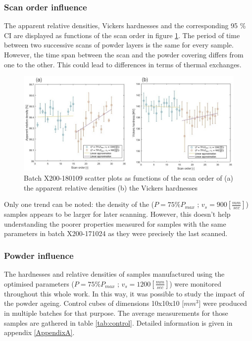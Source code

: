 \subsubsection{Scan order influence}
The apparent relative densities, Vickers hardnesses and the corresponding 95 \% CI are displayed as functions of the scan order in figure \ref{fig:180109-SO}. The period of time between two successive scans of powder layers is the same for every sample. However, the time span between the scan and the powder covering differs from one to the other. This could lead to differences in terms of thermal exchanges.\\

\begin{figure}[ht]
\centering
\centerline{\includegraphics[scale=0.62]{Images/180109-SO}}
\decoRule
\caption[Batch X200-180109 scatter plots as functions of the scan order of (a) the apparent relative densities (b) the Vickers hardnesses]{Batch X200-180109 scatter plots as functions of the scan order of (a) the apparent relative densities (b) the Vickers hardnesses}
\label{fig:180109-SO}
\end{figure} 

Only one trend can be noted: the density of the ($P=75\% P_{max}$ ; $v_s=900 [\frac{mm}{sec}]$) samples appears to be larger for later scanning. However, this doesn't help understanding the poorer properties measured for samples with the same parameters in batch X200-171024 as they were precisely the last scanned. \\

\subsubsection{Powder influence}
\label{RPI}
The hardnesses and relative densities of samples manufactured using the optimised parameters ($P=75\% P_{max}$ ; $v_s=1200 [\frac{mm}{sec}]$) were monitored throughout this whole work. In this way, it was possible to study the impact of the powder ageing. Control cubes of dimensions 10x10x10 [$mm^3$] were produced in multiple batches for that purpose. The average measurements for those samples are gathered in table \ref{tab:control}. Detailed information is given in appendix \ref{AppendixA}.\\

